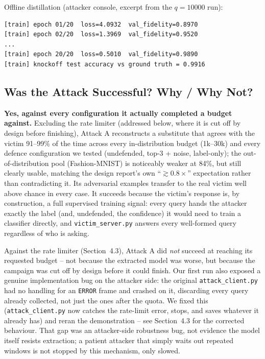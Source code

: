 \documentclass[11pt]{article}
\begin{document}
Offline distillation (attacker console, excerpt from the $q=10000$ run):
\begin{lstlisting}
[train] epoch 01/20  loss=4.0932  val_fidelity=0.8970
[train] epoch 02/20  loss=1.3969  val_fidelity=0.9520
...
[train] epoch 20/20  loss=0.5010  val_fidelity=0.9890
[train] knockoff test accuracy vs ground truth = 0.9916
\end{lstlisting}

\subsection{Was the Attack Successful? Why / Why Not?}

\textbf{Yes, against every configuration it actually completed a budget
against.} Excluding the rate limiter (addressed below, where it is cut off
by design before finishing), Attack A reconstructs a substitute that agrees
with the victim 91--99\% of the time across every in-distribution budget
(1k--30k) and every defence configuration we tested (undefended, top-3 +
noise, label-only); the out-of-distribution pool (Fashion-MNIST) is
noticeably weaker at 84\%, but still clearly usable, matching the design
report's own ``$\gtrsim 0.8\times$'' expectation rather than contradicting
it. Its adversarial examples transfer to the real victim well above chance
in every case. It succeeds because the victim's response is, by
construction, a full supervised training signal: every query hands the
attacker exactly the label (and, undefended, the confidence) it would need
to train a classifier directly, and \texttt{victim\_server.py} answers every
well-formed query regardless of who is asking.

Against the rate limiter (Section~4.3), Attack A did \emph{not} succeed at
reaching its requested budget -- not because the extracted model was worse,
but because the campaign was cut off by design before it could finish. Our
first run also exposed a genuine implementation bug on the attacker side:
the original \texttt{attack\_client.py} had no handling for an
\texttt{ERROR} frame and crashed on it, discarding every query already
collected, not just the ones after the quota. We fixed this
(\texttt{attack\_client.py} now catches the rate-limit error, stops, and
saves whatever it already has) and reran the demonstration -- see
Section~4.3 for the corrected behaviour. That gap was an attacker-side
robustness bug, not evidence the model itself resists extraction; a
patient attacker that simply waits out repeated windows is not stopped by
this mechanism, only slowed.
\end{document}
